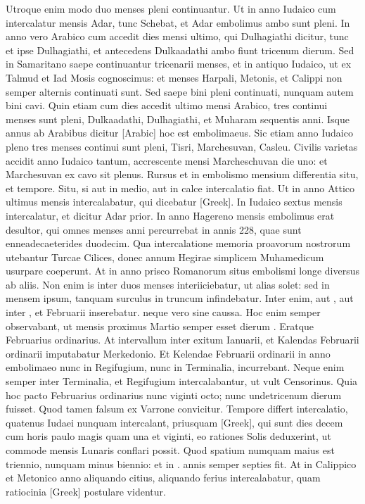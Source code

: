 Utroque enim modo duo menses pleni continuantur.
Ut in anno Iudaico cum intercalatur mensis Adar, tunc
Schebat, et Adar embolimus ambo sunt pleni.
In anno vero Arabico
cum accedit dies mensi ultimo, qui Dulhagiathi dicitur, tunc et ipse
Dulhagiathi, et antecedens Dulkaadathi ambo fiunt tricenum dierum.
Sed in Samaritano saepe continuantur tricenarii menses, et in antiquo
Iudaico, ut ex Talmud et Iad Mosis cognoscimus: et menses Harpali,
Metonis, et Calippi non semper alternis continuati sunt.
Sed saepe bini
pleni continuati, nunquam autem bini cavi.
Quin etiam cum dies accedit
ultimo mensi Arabico, tres continui menses sunt pleni, Dulkaadathi,
Dulhagiathi, et Muharam sequentis anni.
Isque annus ab Arabibus
dicitur \textarabic{[Arabic]} hoc est embolimaeus.
Sic etiam anno Iudaico pleno
tres menses continui sunt pleni, Tisri, Marchesuvan, Casleu.
Civilis
varietas accidit anno Iudaico tantum, accrescente mensi Marcheschuvan
die uno: et Marchesuvan ex cavo sit plenus.
Rursus et in embolismo
mensium differentia situ, et tempore.
Situ, si aut in medio, aut in calce
intercalatio fiat.
Ut in anno Attico ultimus mensis intercalabatur, qui
dicebatur \textgreek{[Greek]}.
In Iudaico sextus mensis intercalatur, et
dicitur Adar prior.
In anno Hagereno mensis embolimus erat desultor,
qui omnes menses anni percurrebat in annis 228, quae sunt enneadecaeterides
duodecim.
Qua intercalatione memoria proavorum nostrorum
utebantur Turcae Cilices, donec annum Hegirae simplicem
Muhamedicum usurpare coeperunt.
At in anno prisco Romanorum
situs embolismi longe diversus ab aliis.
Non enim is inter duos
menses interiiciebatur, ut alias solet: sed in mensem ipsum, tanquam
surculus in truncum infindebatur.
Inter  enim, aut ,
aut inter , et  Februarii inserebatur.
neque vero sine caussa.
Hoc enim semper observabant, ut mensis proximus Martio semper esset
dierum .
Eratque Februarius ordinarius.
At intervallum inter exitum
Ianuarii, et Kalendas Februarii ordinarii imputabatur Merkedonio.
Et Kelendae Februarii ordinarii in anno embolimaeo nunc in Regifugium,
nunc in Terminalia, incurrebant.
Neque enim semper inter
Terminalia, et Regifugium intercalabantur, ut vult Censorinus.
Quia hoc pacto Februarius ordinarius nunc viginti octo; nunc undetricenum
dierum fuisset.
Quod tamen falsum ex Varrone convicitur.
Tempore differt intercalatio, quatenus Iudaei nunquam intercalant,
priusquam \textgreek{[Greek]}, qui sunt dies decem cum horis paulo
magis quam una et viginti, eo rationes Solis deduxerint, ut commode
mensis Lunaris conflari possit.
Quod spatium numquam maius est
triennio, nunquam minus biennio: et in . annis semper septies fit.
At in Calippico et Metonico anno aliquando citius, aliquando ferius
intercalabatur, quam ratiocinia \textgreek{[Greek]} postulare videntur.


